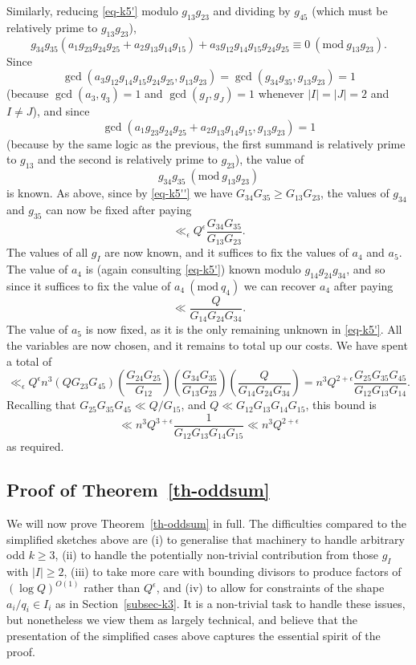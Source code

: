 \documentclass[11pt,letterpaper]{amsart}
\newcommand{\abs}[1]{\left\lvert #1\right\rvert}
\newcommand{\brac}[1]{\left( #1\right)}
\newcommand{\Mod}[1]{\ (\mathrm{mod}\ #1)}
\newcommand{\ogcd}[2]{\gcd(#1,#2)}
\theoremstyle{definition}
\begin{document}
Similarly, reducing \eqref{eq-k5'} modulo $g_{13}g_{23}$ and dividing by $g_{45}$ (which must be relatively prime to $g_{13}g_{23}$),
\[g_{34}g_{35}\brac{a_1g_{23}g_{24}g_{25}+a_2g_{13}g_{14}g_{15}}+a_3g_{12}g_{14}g_{15}g_{24}g_{25} \equiv 0 \Mod{g_{13}g_{23}}.\]
Since 
\[\ogcd{a_3g_{12}g_{14}g_{15}g_{24}g_{25}}{g_{13}g_{23}}=\ogcd{g_{34}g_{35}}{g_{13}g_{23}}=1\]
(because $\ogcd{a_3}{q_3}=1$ and $\ogcd{g_I}{g_J}=1$ whenever $\abs{I}=\abs{J}=2$ and $I\neq J$),
and since
\[\ogcd{a_1g_{23}g_{24}g_{25} + a_2g_{13}g_{14}g_{15}}{g_{13}g_{23}}=1\]
(because by the same logic as the previous, the first summand is relatively prime to $g_{13}$ and the second is relatively prime to $g_{23}$), the value of 
\[g_{34}g_{35}\Mod{g_{13}g_{23}}\]
is known. As above, since by \eqref{eq-k5''} we have $G_{34}G_{35}\geq G_{13}G_{23}$, the values of $g_{34}$ and $g_{35}$ can now be fixed after paying
\[\ll_\epsilon Q^\epsilon \frac{G_{34}G_{35}}{G_{13}G_{23}}.\]
The values of all $g_I$ are now known, and it suffices to fix the values of $a_4$ and $a_5$. The value of $a_4$ is (again consulting \eqref{eq-k5'}) known modulo $g_{14}g_{24}g_{34}$, and so since it suffices to fix the value of $a_4\Mod{q_4}$ we can recover $a_4$ after paying
\[\ll \frac{Q}{G_{14}G_{24}G_{34}}.\]
The value of $a_5$ is now fixed, as it is the only remaining unknown in \eqref{eq-k5'}. All the variables are now chosen, and it remains to total up our costs. We have spent a total of
\[\ll_\epsilon Q^\epsilon n^3\brac{QG_{23}G_{45}}\brac{\frac{G_{24}G_{25}}{G_{12}}}\brac{\frac{G_{34}G_{35}}{G_{13}G_{23}}}\brac{\frac{Q}{G_{14}G_{24}G_{34}}}=n^3Q^{2+\epsilon}\frac{G_{25}G_{35}G_{45}}{G_{12}G_{13}G_{14}}.\]
Recalling that $G_{25}G_{35}G_{45}\ll Q/G_{15}$, and $Q\ll  G_{12}G_{13}G_{14}G_{15}$, this bound is
\[\ll n^3Q^{3+\epsilon}\frac{1}{G_{12}G_{13}G_{14}G_{15}}\ll n^3Q^{2+\epsilon}\]
as required.



\subsection{Proof of Theorem~\ref{th-oddsum}}
We will now prove Theorem~\ref{th-oddsum} in full. The difficulties compared to the simplified sketches above are (i) to generalise that machinery to handle arbitrary odd $k\geq 3$, (ii) to handle the potentially non-trivial contribution from those $g_I$ with $\lvert I\rvert\geq 2$, (iii) to take more care with bounding divisors to produce factors of $(\log Q)^{O(1)}$ rather than $Q^\epsilon$, and (iv) to allow for constraints of the shape $a_i/q_i\in I_i$ as in Section~\ref{subsec-k3}. It is a non-trivial task to handle these issues, but nonetheless we view them as largely technical, and believe that the presentation of the simplified cases above captures the essential spirit of the proof.
\end{document}
